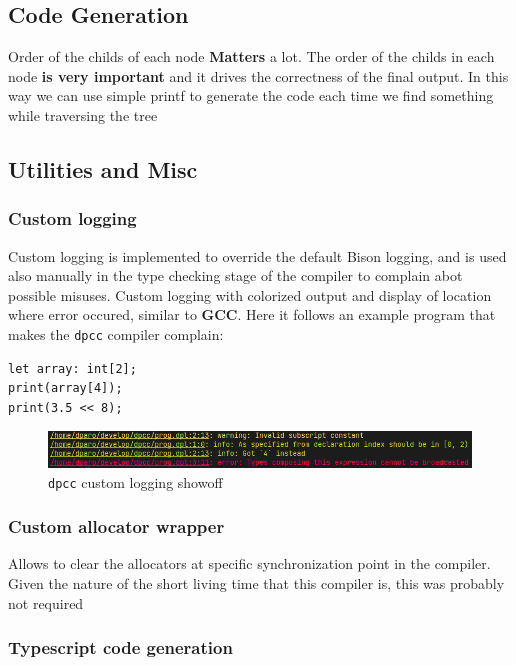 \documentclass[a4paper]{article}
\begin{document}
\subsection{Code Generation}

Order of the childs of each node \textbf{Matters} a lot.
The order of the childs in each node \textbf{is very important} and it drives
the correctness of the final output. In this way we can use simple printf to generate
the code each time we find something while traversing the tree

\subsection{Utilities and Misc}
\subsubsection{Custom logging}
Custom logging is implemented to override the default Bison logging, and is used also manually in the type checking
stage of the compiler to complain abot possible misuses.
Custom logging with colorized output and display of location where error occured, similar to \textbf{GCC}. Here it follows an example program that makes the \texttt{dpcc} compiler complain:
\begin{lstlisting}[language=DPL]
let array: int[2];
print(array[4]);
print(3.5 << 8);
\end{lstlisting}
    \begin{figure}[H]
        \centering
        \includegraphics[width=\linewidth]{imgs/log.png}
        \caption{\texttt{dpcc} custom logging showoff}
    \end{figure}

\subsubsection{Custom allocator wrapper}


Allows to clear the allocators at specific synchronization point in the compiler.
Given the nature of the short living time that this compiler is, this was probably not required

\subsubsection{Typescript code generation}
\end{document}
